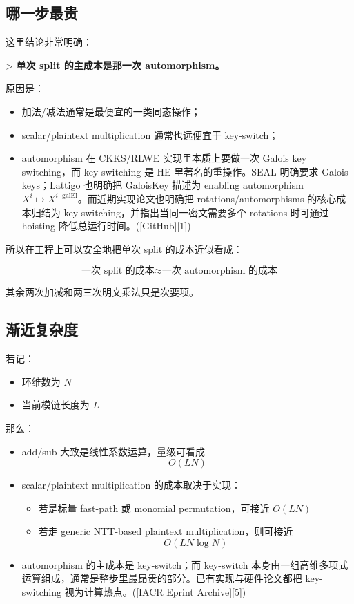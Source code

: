 \documentclass{article}
\begin{document}
\subsection{哪一步最贵}

这里结论非常明确：

> \textbf{单次 split 的主成本是那一次 automorphism。}

原因是：

\begin{itemize}
    \item 加法/减法通常是最便宜的一类同态操作；
    \item scalar/plaintext multiplication 通常也远便宜于 key-switch；
    \item automorphism 在 CKKS/RLWE 实现里本质上要做一次 Galois key switching，而 key switching 是 HE 里著名的重操作。SEAL 明确要求 Galois keys；Lattigo 也明确把 GaloisKey 描述为 enabling automorphism \(X^i\mapsto X^{i\cdot \mathrm{galEl}}\)。而近期实现论文也明确把 rotations/automorphisms 的核心成本归结为 key-switching，并指出当同一密文需要多个 rotations 时可通过 hoisting 降低总运行时间。([GitHub][1])
\end{itemize}

所以在工程上可以安全地把单次 split 的成本近似看成：

\[
\boxed{
\text{一次 split 的成本} \approx \text{一次 automorphism 的成本}
}
\]

其余两次加减和两三次明文乘法只是次要项。

\subsection{渐近复杂度}

若记：

\begin{itemize}
    \item 环维数为 \(N\)
    \item 当前模链长度为 \(L\)
\end{itemize}

那么：

\begin{itemize}
    \item add/sub 大致是线性系数运算，量级可看成
    \[
    O(LN)
    \]
    \item scalar/plaintext multiplication 的成本取决于实现：
    \begin{itemize}
        \item 若是标量 fast-path 或 monomial permutation，可接近 \(O(LN)\)
        \item 若走 generic NTT-based plaintext multiplication，则可接近
        \[
        O(LN\log N)
        \]
    \end{itemize}
    \item automorphism 的主成本是 key-switch；而 key-switch 本身由一组高维多项式运算组成，通常是整步里最昂贵的部分。已有实现与硬件论文都把 key-switching 视为计算热点。([IACR Eprint Archive][5])
\end{itemize}
\end{document}
